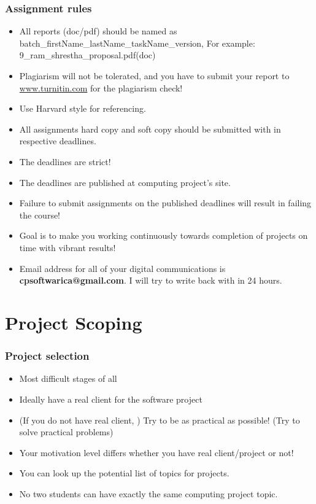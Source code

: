 \documentclass{beamer}
\begin{document}
\begin{frame}[t]\frametitle{Assignment rules}
\begin{itemize}
    \item All reports (doc/pdf) should be named as batch\_firstName\_lastName\_taskName\_version, For example: 9\_ram\_shrestha\_proposal.pdf(doc)
    \item Plagiarism will not be tolerated, and you have to submit your report to \url{www.turnitin.com} for the plagiarism check!
    \item Use Harvard style for referencing.
    \item All assignments hard copy and soft copy should be submitted with in respective deadlines.
    \item The deadlines are strict!
    \item The deadlines are published at computing project's site.
    \item Failure to submit assignments on the published deadlines will result in failing the course!
    \item Goal is to make you working continuously towards completion of projects on time with vibrant results!
    \item Email address for all of your digital communications is \textbf{cpsoftwarica@gmail.com}. I will try to write back with in 24 hours.
\end{itemize}
\end{frame}

\section{Project Scoping} %
\label{sec:scoping}

\begin{frame}[t]\frametitle{Project selection}
\begin{itemize}
    \item Most difficult stages of all
    \item Ideally have a real client for the software project
    \item (If you do not have real client, ) Try to be as practical as possible! (Try to solve practical problems)
    \item Your motivation level differs whether you have real client/project or not!
    \item You can look up the potential list of topics for projects.
    \item No two students can have exactly the same computing project topic.
\end{itemize}
\end{frame}
\end{document}
